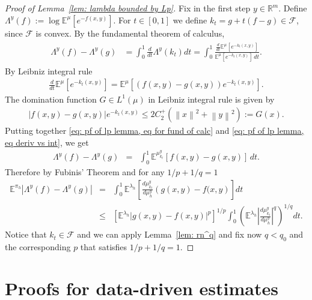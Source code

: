 \documentclass{amsart}
\theoremstyle{definition}
\newcommand{\E}{{\mathbb E}}
\newcommand{\R}{{\mathbb R}}
\newcommand{\norm}[1]{\left\|#1\right\|}
\newcommand{\F}{\mathcal{F}}
\begin{document}
\begin{proof}[Proof of Lemma~\ref{lem: lambda bounded by Lp}]
    Fix in the first step $y \in \R^m$. Define $\Lambda^y(f) := \log \E^{\mu} \left[e^{-f(x, y)}\right]$.  For $t \in [0, 1]$ we define $k_t = g+t(f-g) \in \F$, since $\F$ is convex. By the fundamental theorem of calculus,
    \begin{eqnarray}
    \begin{aligned}\label{eq: pf of lp lemma, eq for fund of calc}
         \Lambda^y(f) - \Lambda^y(g) &= \int_0^1 \frac{d}{dt} \Lambda^y(k_t) dt 
          =  \int_0^1 \frac{\frac{d}{dt} \E^{\mu} \left[ e^{-k_t(x, y) } \right]}{\E^{\mu} \left[ e^{-k_t(x, y)} \right]  \, dt}.  
         \end{aligned}
    \end{eqnarray}
    By Leibniz integral rule 
    \begin{eqnarray}\label{eq: pf of lp lemma, eq deriv vs int}
        \frac{d}{dt} \E^{\mu} \left[ e^{-k_t(x, y)} \right] = \E^{\mu} \left[  \left(f(x, y) - g(x, y)\right)  e^{-k_t(x, y) } \right].
    \end{eqnarray}
    The domination function $G \in L^1(\mu)$ in Leibniz integral rule is given by
    \begin{eqnarray*}
        \left|f(x, y) - g(x, y)\right|  e^{-k_t(x, y) } \le 2C_2^+ (\norm{x}^2 + \norm{y}^2) := G(x).
    \end{eqnarray*} 
    Putting together \eqref{eq: pf of lp lemma, eq for fund of calc} and \eqref{eq: pf of lp lemma, eq deriv vs int}, we get
    \begin{eqnarray*}
        \Lambda^y(f) - \Lambda^y(g) & = & \int_0^1 \E^{\mu^y_{k_t}} \left[f(x, y) - g(x, y)\right]  \, dt.
    \end{eqnarray*}
    Therefore by Fubinis' Theorem and for any $1/p + 1/q = 1$
    \begin{eqnarray*}
        \E^{\pi_h} |\Lambda^y(f) - \Lambda^y(g)| &=& \int_0^1 \E^{\lambda_h} \left[ \frac{d \mu^y_{k_t}}{d \mu_h^y}  \left( g(x, y) - f(x, y\right) \right] dt \\
        & \le &  \left[ \E^{\lambda_h}  \left| g(x, y) - f(x, y)\right|^p  \right]^{1/p}  \int_0^1 \left( \E^{\lambda_h}\left| \frac{d \mu^y_{k_t}}{d \mu_h^y} \right|^q  \right)^{1/q} dt.
    \end{eqnarray*}
    Notice that $k_t \in \F$ and we can apply Lemma~\ref{lem: rn^q} and fix now $q < q_0$ and the corresponding $p$ that satisfies $1/p + 1/q = 1$.
\end{proof}
\section{Proofs for data-driven estimates}
\end{document}
